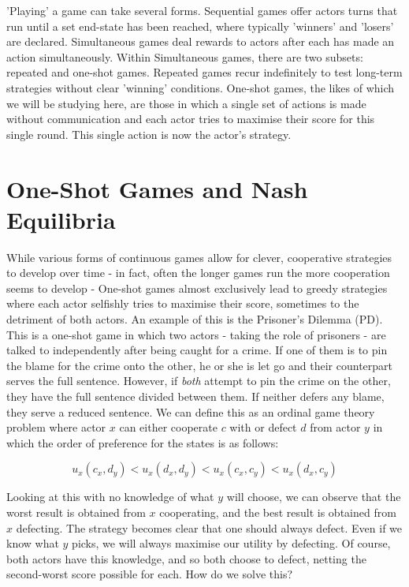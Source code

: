 'Playing' a game can take several forms. Sequential games offer actors turns that run until a set end-state has been reached, where typically 'winners' and 'losers' are declared. Simultaneous games deal rewards to actors after each has made an action simultaneously. Within Simultaneous games, there are two subsets: repeated and one-shot games. Repeated games recur indefinitely to test long-term strategies without clear 'winning' conditions. One-shot games, the likes of which we will be studying here, are those in which a single set of actions is made without communication and each actor tries to maximise their score for this single round. This single action is now the actor's strategy.

\section{One-Shot Games and Nash Equilibria}\label{sec:1shot}

While various forms of continuous games allow for clever, cooperative strategies to develop over time - in fact, often the longer games run the more cooperation seems to develop \cite{djiguemde2022continuous} - One-shot games almost exclusively lead to greedy strategies where each actor selfishly tries to maximise their score, sometimes to the detriment of both actors. An example of this is the Prisoner's Dilemma (PD). This is a one-shot game in which two actors - taking the role of prisoners - are talked to independently after being caught for a crime. If one of them is to pin the blame for the crime onto the other, he or she is let go and their counterpart serves the full sentence. However, if \textit{both} attempt to pin the crime on the other, they have the full sentence divided between them. If neither defers any blame, they serve a reduced sentence. We can define this as an ordinal game theory problem where actor $x$ can either cooperate $c$ with or defect $d$ from actor $y$ in which the order of preference for the states is as follows:

\[u_x(c_x,d_y) < u_x(d_x,d_y) < u_x(c_x,c_y) < u_x(d_x,c_y)\]

Looking at this with no knowledge of what $y$ will choose, we can observe that the worst result is obtained from $x$ cooperating, and the best result is obtained from $x$ defecting. The strategy becomes clear that one should always defect. Even if we know what $y$ picks, we will always maximise our utility by defecting. Of course, both actors have this knowledge, and so both choose to defect, netting the second-worst score possible for each. How do we solve this?

